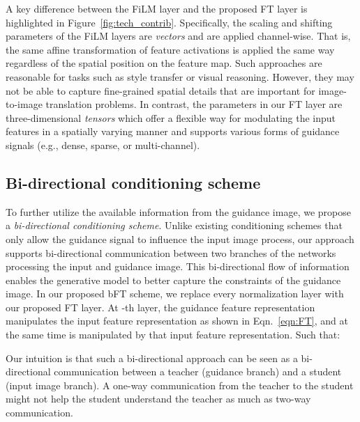 \documentclass[10pt,twocolumn,letterpaper]{article}
\newlength\secmargin
\newcommand{\figref}[1]{Figure~\ref{fig:#1}}
\begin{document}
A key difference between the FiLM layer \cite{perez2018film} and the proposed FT layer is highlighted in \figref{tech_contrib}. Specifically, the scaling  and shifting  parameters of the FiLM layers are \emph{vectors} and are applied channel-wise. That is, the same affine transformation of feature activations is applied the same way regardless of the spatial position on the feature map. Such approaches are reasonable for tasks such as style transfer or visual reasoning. However, they may not be able to capture fine-grained spatial details that are important for image-to-image translation problems. In contrast, the parameters in our FT layer are three-dimensional \emph{tensors} which offer a flexible way for modulating the input features in a spatially varying manner and supports various forms of guidance signals (e.g., dense, sparse, or multi-channel).


\vspace{\secmargin}
\subsection{Bi-directional conditioning scheme}
To further utilize the available information from the guidance image, we propose a \emph{bi-directional conditioning scheme}. 
Unlike existing conditioning schemes that only allow the guidance signal to influence the input image process, our approach supports bi-directional communication between two branches of the networks processing the input and guidance image.
This bi-directional flow of information enables the generative model to better capture the constraints of the guidance image.
In our proposed bFT scheme, we replace every normalization layer with our proposed FT layer. At -th layer, the guidance feature representation manipulates the input feature representation as shown in Eqn.~\ref{eqn:FT}, and at the same time is manipulated by that input feature representation. Such that:

Our intuition is that such a bi-directional approach can be seen as a bi-directional communication between a teacher (guidance branch) and a student (input image branch). 
A one-way communication from the teacher to the student might not help the student understand the teacher as much as two-way communication. 
 \vspace{\secmargin}
\end{document}
